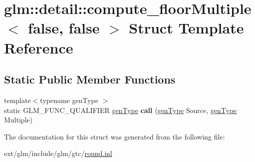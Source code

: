 \hypertarget{structglm_1_1detail_1_1compute__floor_multiple_3_01false_00_01false_01_4}{\section{glm\-:\-:detail\-:\-:compute\-\_\-floor\-Multiple$<$ false, false $>$ Struct Template Reference}
\label{structglm_1_1detail_1_1compute__floor_multiple_3_01false_00_01false_01_4}
}
\subsection*{Static Public Member Functions}
\begin{DoxyCompactItemize}
\item 
\hypertarget{structglm_1_1detail_1_1compute__floor_multiple_3_01false_00_01false_01_4_a795b0efa8ebff0dcbbc055cdccd2156c}{{\footnotesize template$<$typename gen\-Type $>$ }\\static G\-L\-M\-\_\-\-F\-U\-N\-C\-\_\-\-Q\-U\-A\-L\-I\-F\-I\-E\-R \hyperlink{structglm_1_1detail_1_1gen_type}{gen\-Type} {\bfseries call} (\hyperlink{structglm_1_1detail_1_1gen_type}{gen\-Type} Source, \hyperlink{structglm_1_1detail_1_1gen_type}{gen\-Type} Multiple)}\label{structglm_1_1detail_1_1compute__floor_multiple_3_01false_00_01false_01_4_a795b0efa8ebff0dcbbc055cdccd2156c}

\end{DoxyCompactItemize}


The documentation for this struct was generated from the following file\-:\begin{DoxyCompactItemize}
\item 
ext/glm/include/glm/gtc/\hyperlink{round_8inl}{round.\-inl}\end{DoxyCompactItemize}
